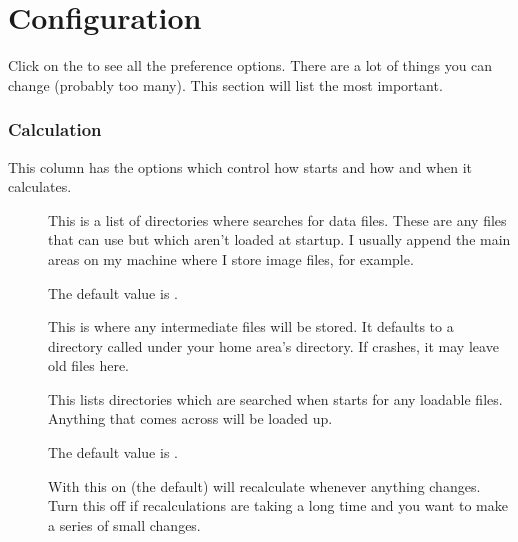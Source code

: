 \chapter{Configuration}

Click on the  to see all the preference
options. There are a lot of things you can change (probably too many). This
section will list the most important.

\subsection{Calculation}

This column has the options which control how \nip{} starts and how and when
it calculates.

\begin{description}

\item[]

This is a list of directories where \nip{} searches for data files. These are
any files that \nip{} can use but which aren't loaded at startup. I usually
append the main areas on my machine where I store image files, for example.

The default value is .

\item[] 

This is where any intermediate files will be stored.  It defaults to a
directory called  under your home area's  directory. If
 crashes, it may leave old files here.

\item[]

This lists directories which are searched when \nip{} starts for any loadable
files. Anything that \nip{} comes across will be loaded up. 

The default value is .

\item[] 

With this on (the default) \nip{} will recalculate whenever anything changes.
Turn this off if recalculations are taking a long time and you want to make a
series of small changes.

\item[] 


\end{description}
